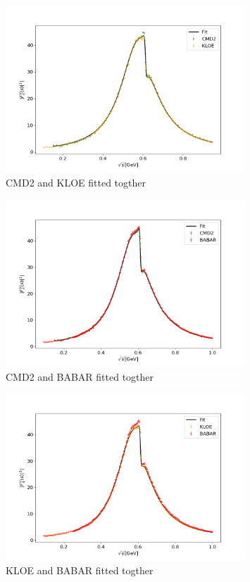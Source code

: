 \documentclass[a4paper]{article}
\begin{document}
\begin{figure}[H]
    \centering
    \includegraphics[width=0.8\textwidth]{./plots/CMD2-KLOE.png}
    \caption{CMD2 and KLOE fitted togther   \label{fig8}}
\end{figure}
\begin{figure}[H]
    \centering
    \includegraphics[width=0.8\textwidth]{./plots/CMD2-BABAR.png}
    \caption{CMD2 and BABAR fitted togther   \label{fig9}}
\end{figure}
\begin{figure}[H]
    \centering
    \includegraphics[width=0.8\textwidth]{./plots/KLOE-BABAR.png}
    \caption{KLOE and BABAR fitted togther   \label{fig10}}
\end{figure}
\end{document}

